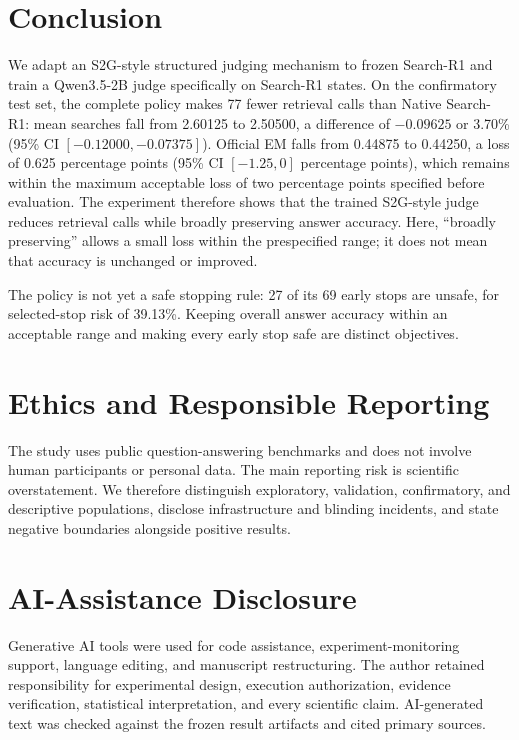 \documentclass[11pt,a4paper]{article}
\begin{document}
\section{Conclusion}

We adapt an S2G-style structured judging mechanism to frozen Search-R1 and train a Qwen3.5-2B judge specifically on Search-R1 states. On the confirmatory test set, the complete policy makes 77 fewer retrieval calls than Native Search-R1: mean searches fall from 2.60125 to 2.50500, a difference of $-0.09625$ or 3.70\% (95\% CI $[-0.12000,-0.07375]$). Official EM falls from 0.44875 to 0.44250, a loss of 0.625 percentage points (95\% CI $[-1.25,0]$ percentage points), which remains within the maximum acceptable loss of two percentage points specified before evaluation. The experiment therefore shows that the trained S2G-style judge reduces retrieval calls while broadly preserving answer accuracy. Here, ``broadly preserving'' allows a small loss within the prespecified range; it does not mean that accuracy is unchanged or improved.

The policy is not yet a safe stopping rule: 27 of its 69 early stops are unsafe, for selected-stop risk of 39.13\%. Keeping overall answer accuracy within an acceptable range and making every early stop safe are distinct objectives.

\section*{Ethics and Responsible Reporting}

The study uses public question-answering benchmarks and does not involve human participants or personal data. The main reporting risk is scientific overstatement. We therefore distinguish exploratory, validation, confirmatory, and descriptive populations, disclose infrastructure and blinding incidents, and state negative boundaries alongside positive results.

\section*{AI-Assistance Disclosure}

Generative AI tools were used for code assistance, experiment-monitoring support, language editing, and manuscript restructuring. The author retained responsibility for experimental design, execution authorization, evidence verification, statistical interpretation, and every scientific claim. AI-generated text was checked against the frozen result artifacts and cited primary sources.
\end{document}
